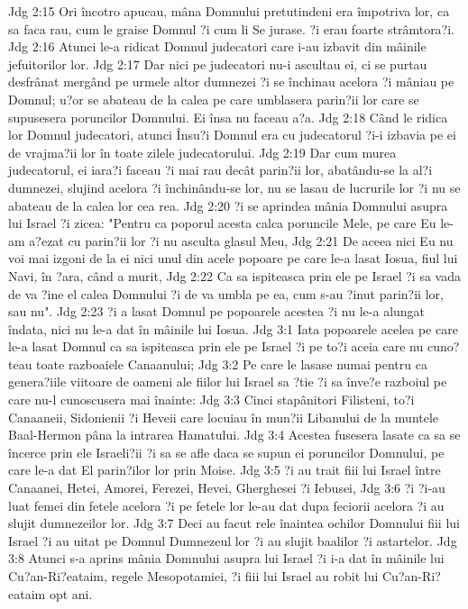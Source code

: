Jdg 2:15  Ori încotro apucau, mâna Domnului pretutindeni era împotriva lor, ca sa faca rau, cum le graise Domnul ?i cum li Se jurase. ?i erau foarte strâmtora?i.
Jdg 2:16  Atunci le-a ridicat Domnul judecatori care i-au izbavit din mâinile jefuitorilor lor.
Jdg 2:17  Dar nici pe judecatori nu-i ascultau ei, ci se purtau desfrânat mergând pe urmele altor dumnezei ?i se închinau acelora ?i mâniau pe Domnul; u?or se abateau de la calea pe care umblasera parin?ii lor care se supusesera poruncilor Domnului. Ei însa nu faceau a?a.
Jdg 2:18  Când le ridica lor Domnul judecatori, atunci Însu?i Domnul era cu judecatorul ?i-i izbavia pe ei de vrajma?ii lor în toate zilele judecatorului.
Jdg 2:19  Dar cum murea judecatorul, ei iara?i faceau ?i mai rau decât parin?ii lor, abatându-se la al?i dumnezei, slujind acelora ?i închinându-se lor, nu se lasau de lucrurile lor ?i nu se abateau de la calea lor cea rea.
Jdg 2:20  ?i se aprindea mânia Domnului asupra lui Israel ?i zicea: "Pentru ca poporul acesta calca poruncile Mele, pe care Eu le-am a?ezat cu parin?ii lor ?i nu asculta glasul Meu,
Jdg 2:21  De aceea nici Eu nu voi mai izgoni de la ei nici unul din acele popoare pe care le-a lasat Iosua, fiul lui Navi, în ?ara, când a murit,
Jdg 2:22  Ca sa ispiteasca prin ele pe Israel ?i sa vada de va ?ine el calea Domnului ?i de va umbla pe ea, cum s-au ?inut parin?ii lor, sau nu".
Jdg 2:23  ?i a lasat Domnul pe popoarele acestea ?i nu le-a alungat îndata, nici nu le-a dat în mâinile lui Iosua.
Jdg 3:1  Iata popoarele acelea pe care le-a lasat Domnul ca sa ispiteasca prin ele pe Israel ?i pe to?i aceia care nu cuno?teau toate razboaiele Canaanului;
Jdg 3:2  Pe care le lasase numai pentru ca genera?iile viitoare de oameni ale fiilor lui Israel sa ?tie ?i sa înve?e razboiul pe care nu-l cunoscusera mai înainte:
Jdg 3:3  Cinci stapânitori Filisteni, to?i Canaaneii, Sidonienii ?i Heveii care locuiau în mun?ii Libanului de la muntele Baal-Hermon pâna la intrarea Hamatului.
Jdg 3:4  Acestea fusesera lasate ca sa se încerce prin ele Israeli?ii ?i sa se afle daca se supun ei poruncilor Domnului, pe care le-a dat El parin?ilor lor prin Moise.
Jdg 3:5  ?i au trait fiii lui Israel între Canaanei, Hetei, Amorei, Ferezei, Hevei, Gherghesei ?i Iebusei,
Jdg 3:6  ?i ?i-au luat femei din fetele acelora ?i pe fetele lor le-au dat dupa feciorii acelora ?i au slujit dumnezeilor lor.
Jdg 3:7  Deci au facut rele înaintea ochilor Domnului fiii lui Israel ?i au uitat pe Domnul Dumnezeul lor ?i au slujit baalilor ?i astartelor.
Jdg 3:8  Atunci s-a aprins mânia Domnului asupra lui Israel ?i i-a dat în mâinile lui Cu?an-Ri?eataim, regele Mesopotamiei, ?i fiii lui Israel au robit lui Cu?an-Ri?eataim opt ani.
